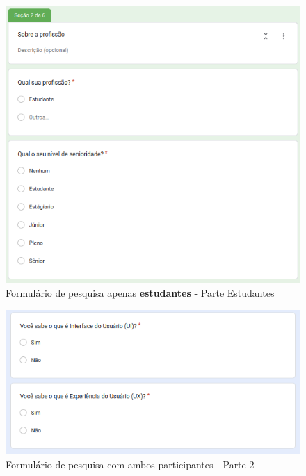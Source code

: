 \begin{figure}[!h]
	\begin{center}
	    \includegraphics[scale=0.6]{figs/Form/03.png}
	\end{center}
	\caption{\label{AP_PEs}Formulário de pesquisa apenas \textbf{estudantes} - Parte Estudantes}
\end{figure}

\begin{figure}[!h]
	\begin{center}
	    \includegraphics[scale=0.6]{figs/Form/04.png}
	\end{center}
	\caption{\label{AP_P02}Formulário de pesquisa com ambos participantes - Parte 2}
\end{figure}

\newpage

